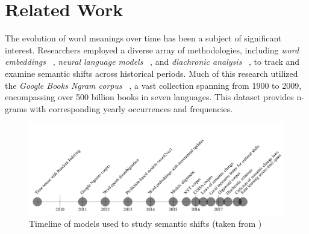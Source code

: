 
\section{Related Work} \label{sec:relatedwork}
The evolution of word meanings over time has been a subject of significant interest.
Researchers employed a diverse array of methodologies, including \emph{word embeddings} ~\cite{kulkarni2014statisticallysignificantdetectionlinguistic},
\emph{neural language models} ~\cite{kim-etal-2014-temporal}, and \emph{diachronic analysis} ~\cite{hamilton-etal-2016-diachronic, kutuzov-etal-2018-diachronic},
to track and examine semantic shifts across historical periods.
Much of this research utilized the \emph{Google Books Ngram corpus}
~\cite{gulordava-baroni-2011-distributional, kim-etal-2014-temporal, kulkarni2014statisticallysignificantdetectionlinguistic, 10.1007/978-3-319-50496-4_18, hamilton-etal-2016-cultural, hamilton-etal-2016-diachronic, kutuzov-etal-2018-diachronic},
a vast collection spanning from 1900 to 2009,
encompassing over 500 billion books in seven languages.
This dataset provides n-grams with corresponding yearly occurrences and frequencies.

\begin{figure}[tbh]
\vspace{-1em}
\centering
\includegraphics[scale=0.45]{figures/survey}
\caption{Timeline of models used to study semantic shifts (taken from \cite{kutuzov-etal-2018-diachronic})}\label{fig:testsvg}
\end{figure}

